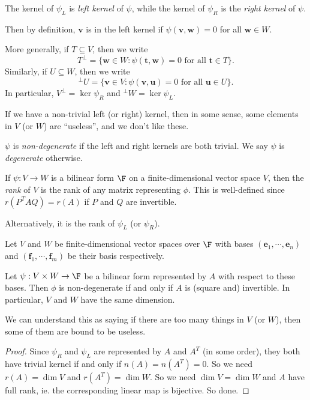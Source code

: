 \documentclass[a4paper]{article}
\begin{document}
\begin{defi}
  The kernel of $\psi_L$ is \emph{left kernel} of $\psi$, while the kernel of $\psi_R$ is the \emph{right kernel} of $\psi$.
\end{defi}
Then by definition, $\mathbf{v}$ is in the left kernel if $\psi(\mathbf{v}, \mathbf{w}) = 0$ for all $\mathbf{w} \in W$.

More generally, if $T\subseteq V$, then we write
\[
  T^\bot = \{\mathbf{w} \in W: \psi(\mathbf{t}, \mathbf{w}) = 0\text{ for all }\mathbf{t} \in T\}.
\]
Similarly, if $U\subseteq W$, then we write
\[
  ^\bot U = \{\mathbf{v} \in V: \psi(\mathbf{v}, \mathbf{u}) = 0\text{ for all }\mathbf{u}\in U\}.
\]
In particular, $V^\bot = \ker \psi_R$ and $^\bot W = \ker \psi_L$.

If we have a non-trivial left (or right) kernel, then in some sense, some elements in $V$ (or $W$) are ``useless'', and we don't like these.
\begin{defi}
  $\psi$ is \emph{non-degenerate} if the left and right kernels are both trivial. We say $\psi$ is \emph{degenerate} otherwise.
\end{defi}

\begin{defi}
  If $\psi: V\to W$ is a bilinear form $\F$ on a finite-dimensional vector space $V$, then the \emph{rank} of $V$ is the rank of any matrix representing $\phi$. This is well-defined since $r(P^T AQ) = r(A)$ if $P$ and $Q$ are invertible.

  Alternatively, it is the rank of $\psi_L$ (or $\psi_R$).
\end{defi}

\begin{lemma}
  Let $V$ and $W$ be finite-dimensional vector spaces over $\F$ with bases $(\mathbf{e}_1, \cdots, \mathbf{e}_n)$ and $(\mathbf{f}_1, \cdots, \mathbf{f}_m)$ be their basis respectively.

  Let $\psi: V\times W \to \F$ be a bilinear form represented by $A$ with respect to these bases. Then $\phi$ is non-degenerate if and only if $A$ is (square and) invertible. In particular, $V$ and $W$ have the same dimension.
\end{lemma}
We can understand this as saying if there are too many things in $V$ (or $W$), then some of them are bound to be useless.

\begin{proof}
  Since $\psi_R$ and $\psi_L$ are represented by $A$ and $A^T$ (in some order), they both have trivial kernel if and only if $n(A) = n(A^T) = 0$. So we need $r(A) = \dim V$ and $r(A^T) = \dim W$. So we need $\dim V = \dim W$ and $A$ have full rank, ie. the corresponding linear map is bijective. So done.
\end{proof}
\end{document}
